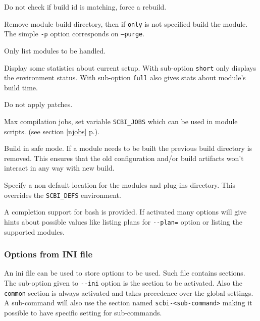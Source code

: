 \documentclass[a4paper,12pt,twoside]{article}
\newcommand{\code}[1]{\texttt{#1}}
\newcommand{\seeref}[1]{see section \ref{#1} p.\pageref{#1}}
\newcommand{\ddash}{-{}-}
\begin{document}
\begin{description}[font=\texttt]
	\item[-f | \ddash{}force] Do not check if build id is matching, force a rebuild.

	\item[-p | \ddash{}purge{[:only]}] Remove module build directory, then if \code{only} is not specified build the module. The simple \code{-p} option corresponds on \code{--purge}.

	\item[\ddash{}dry-run] Only list modules to be handled.

	\item[\ddash{}stat:{[}short|full{]}] Display some statistics about current setup. With sub-option \code{short} only displays the environment status. With sub-option \code{full} also gives stats about module's build time.

	\item[-n | \ddash{}no-patch] Do not apply patches.

	\item[-j | \ddash{}jobs=<n>] Max compilation jobs, set variable \code{SCBI\_JOBS} which can be used in module scripts. (\seeref{njobs}).

	\item[\ddash{}safe] Build in safe mode. If a module needs to be built the previous build directory is removed. This ensures that the old configuration and/or build artifacts won't interact in any way with new build.

	\item[\ddash{}plugins=<directory>] Specify a non default location for the modules and plug-ins directory. This overrides the \code{SCBI\_DEFS} environment.
\end{description}

A completion support for bash is provided. If activated many options will give hints about possible values like listing plans for \code{\ddash{}plan=} option or listing the supported modules.

\subsubsection{Options from INI file}
\label{inifile}

An ini file can be used to store options to be used. Such file contains sections. The sub-option given to \code{\ddash{}ini} option is the section to be activated. Also the \code{common} section is always activated and takes precedence over the global settings. A sub-command will also use the section named \code{scbi-<sub-command>} making it possible to have specific setting for sub-commands.
\end{document}
